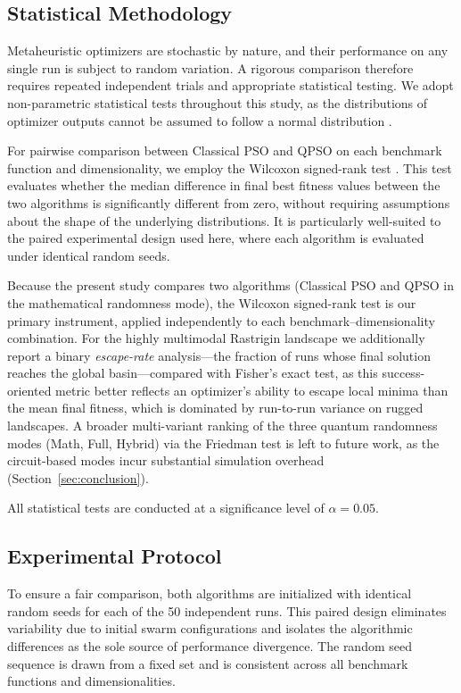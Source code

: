 \subsection{Statistical Methodology}
\label{subsec:statistics}

Metaheuristic optimizers are stochastic by nature, and their performance on any single run is subject to random variation. A rigorous comparison therefore requires repeated independent trials and appropriate statistical testing. We adopt non-parametric statistical tests throughout this study, as the distributions of optimizer outputs cannot be assumed to follow a normal distribution \cite{Derrac2011}.

For pairwise comparison between Classical PSO and QPSO on each benchmark function and dimensionality, we employ the Wilcoxon signed-rank test \cite{Wilcoxon1945}. This test evaluates whether the median difference in final best fitness values between the two algorithms is significantly different from zero, without requiring assumptions about the shape of the underlying distributions. It is particularly well-suited to the paired experimental design used here, where each algorithm is evaluated under identical random seeds.

Because the present study compares two algorithms (Classical PSO and QPSO in the mathematical randomness mode), the Wilcoxon signed-rank test is our primary instrument, applied independently to each benchmark--dimensionality combination. For the highly multimodal Rastrigin landscape we additionally report a binary \emph{escape-rate} analysis---the fraction of runs whose final solution reaches the global basin---compared with Fisher's exact test, as this success-oriented metric better reflects an optimizer's ability to escape local minima than the mean final fitness, which is dominated by run-to-run variance on rugged landscapes. A broader multi-variant ranking of the three quantum randomness modes (Math, Full, Hybrid) via the Friedman test \cite{Friedman1937} is left to future work, as the circuit-based modes incur substantial simulation overhead (Section~\ref{sec:conclusion}).

All statistical tests are conducted at a significance level of $\alpha = 0.05$.

\subsection{Experimental Protocol}
\label{subsec:protocol}

To ensure a fair comparison, both algorithms are initialized with identical random seeds for each of the 50 independent runs. This paired design eliminates variability due to initial swarm configurations and isolates the algorithmic differences as the sole source of performance divergence. The random seed sequence is drawn from a fixed set and is consistent across all benchmark functions and dimensionalities.

